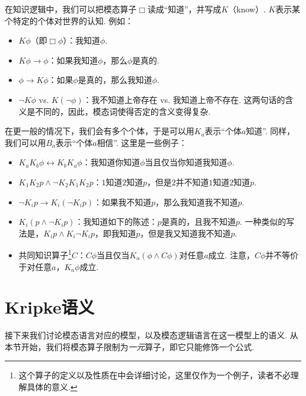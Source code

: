 \begin{example}[知识逻辑]

在知识逻辑中，我们可以把模态算子$\Box$读成“知道”，并写成$K$（know）. $K$表示某个特定的个体对世界的认知. 例如：

\begin{itemize}
    \item $K\phi$（即$\Box\phi$）：我知道$\phi$. 
    \item $K\phi\to\phi$：如果我知道$\phi$，那么$\phi$是真的. 
    \item $\phi\to K\phi$：如果$\phi$是真的，那么我知道$\phi$. 
    \item $\neg K\phi$ vs. $K(\neg\phi)$：我不知道上帝存在 vs. 我知道上帝不存在. 这两句话的含义是不同的，因此，模态词使得否定的含义变得复杂. 
\end{itemize}

在更一般的情况下，我们会有多个个体，于是可以用$K_a$表示“个体$a$知道”. 同样，我们可以用$B_a$表示“个体$a$相信”. 这里是一些例子：

\begin{itemize}
    \item $K_aK_b\phi\leftrightarrow K_bK_a\phi$：我知道你知道$\phi$当且仅当你知道我知道$\phi$. 
    \item $K_1K_2p\wedge \neg K_2K_1K_2 p$：$1$知道$2$知道$p$，但是$2$并不知道$1$知道$2$知道$p$. 
    \item $\neg K_i p\to K_i(\neg K_i p)$：如果我不知道$p$，那么我知道我不知道$p$. 
    \item $K_i(p\wedge\neg K_i p)$：我知道如下的陈述：$p$是真的，且我不知道$p$. 一种类似的写法是，$K_ip\wedge K_i\neg K_ip$，即我知道$p$，但是我又知道我不知道$p$. 
    \item 共同知识算子\footnote{这个算子的定义以及性质在中会详细讨论，这里仅作为一个例子，读者不必理解具体的意义. }$C$：$C \phi$当且仅当$K_a(\phi\wedge C\phi)$对任意$a$成立. 注意，$C\phi$并不等价于对任意$a$，$K_a\phi$成立. 
\end{itemize}
\end{example}

\section{Kripke语义}\label{sec:kripke-semantics}

接下来我们讨论模态语言对应的模型，以及模态逻辑语言在这一模型上的语义. 从本节开始，我们将模态算子限制为\textit{一元}算子，即它只能修饰一个公式. 

